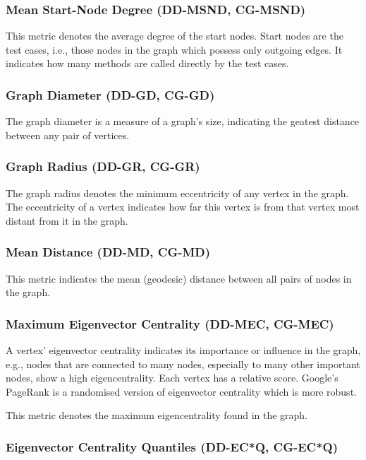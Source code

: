 \subsubsection{Mean Start-Node Degree (DD-MSND, CG-MSND)}

This metric denotes the average degree of the start nodes. Start nodes are the
test cases, i.e., those nodes in the graph which possess only outgoing edges. It
indicates how many methods are called directly by the test cases.

\subsubsection{Graph Diameter (DD-GD, CG-GD)}

The graph diameter is a measure of a graph's size, indicating the geatest
distance between any pair of vertices.

\subsubsection{Graph Radius (DD-GR, CG-GR)}

The graph radius denotes the minimum eccentricity of any vertex in the graph.
The eccentricity of a vertex indicates how far this vertex is from that vertex
most distant from it in the graph.

\subsubsection{Mean Distance (DD-MD, CG-MD)}

This metric indicates the mean (geodesic) distance between all pairs of nodes in
the graph.

\subsubsection{Maximum Eigenvector Centrality (DD-MEC, CG-MEC)}

A vertex' eigenvector centrality indicates its importance or influence in the
graph, e.g., nodes that are connected to many nodes, especially to many other
important nodes, show a high eigencentrality. Each vertex has a relative score.
Google's PageRank is a randomised version of eigenvector centrality which is
more robust. 

This metric denotes the maximum eigencentrality found in the graph.

\subsubsection{Eigenvector Centrality Quantiles (DD-EC*Q, CG-EC*Q)}

